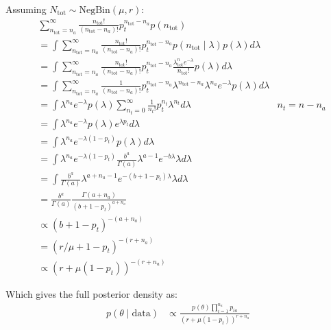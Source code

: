 \documentclass[main.tex]{subfiles}
\begin{document}
Assuming $N_\text{tot} \sim \text{NegBin}(\mu, r)$:
\begin{align}
&\sum_{n_\text{tot}=n_a}^\infty \frac{n_\text{tot}!}{(n_\text{tot}-n_a)!} p_t^{n_\text{tot}-n_a} p(n_\text{tot}) \\
&= \int \sum_{n_\text{tot}=n_a}^\infty \frac{n_\text{tot}!}{(n_\text{tot}-n_a)!} p_t^{n_\text{tot}-n_a} p(n_\text{tot} \mid \lambda) p(\lambda) d\lambda \\
&= \int \sum_{n_\text{tot}=n_a}^\infty \frac{n_\text{tot}!}{(n_\text{tot}-n_a)!} p_t^{n_\text{tot}-n_a} \frac{\lambda^n_\text{tot} e^{-\lambda}}{n_\text{tot}!} p(\lambda) d\lambda \\
&= \int \sum_{n_\text{tot}=n_a}^\infty \frac{1}{(n_\text{tot}-n_a)!} p_t^{n_\text{tot}-n_a} \lambda^{n_\text{tot}-n_a} \lambda^{n_a} e^{-\lambda} p(\lambda) d\lambda \\
&= \int \lambda^{n_a} e^{-\lambda} p(\lambda) \sum_{n_t=0}^\infty \frac{1}{n_t!} p_t^{n_t} \lambda^{n_t} d\lambda &n_t = n-n_a\\
&= \int \lambda^{n_a} e^{-\lambda} p(\lambda) e^{\lambda p_t} d\lambda \\
&= \int \lambda^{n_a} e^{-\lambda(1 - p_t)} p(\lambda) d\lambda \\
&= \int \lambda^{n_a} e^{-\lambda(1 - p_t)} \frac{b^a}{\Gamma(a)} \lambda^{a-1} e^{-b\lambda} \lambda d\lambda \\
&= \int \frac{b^a}{\Gamma(a)} \lambda^{a+n_a-1} e^{-(b+1-p_t)\lambda} \lambda d\lambda \\
&= \frac{b^a}{\Gamma(a)} \frac{\Gamma(a+n_a)}{(b+1-p_t)^{a+n_a}} \\
&\propto (b+1-p_t)^{-(a+n_a)} \\
&= (r/\mu + 1 - p_t)^{-(r+n_a)} \\
&\propto(r + \mu (1- p_t))^{-(r+n_a)}
\end{align}

Which gives the full posterior density as:
\begin{align}
p(\theta \mid \text{data})
&\propto \frac{p(\theta) \prod_{i=1}^{n_a} p_{ia}}{(r + \mu(1 - p_t))^{r+n_a}}
\end{align}
\end{document}
